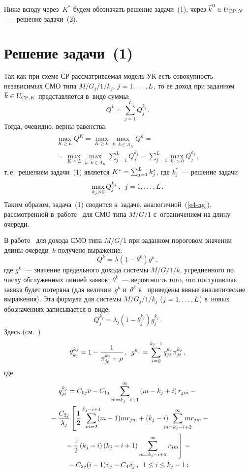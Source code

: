 \begin{multicols}{2}
  Ниже всюду через~$K^*$ будем обозначать решение задачи~(1), через 
$\overline{k}^0\hm\in U_{\mathrm{CP},N}$~--- решение задачи~(2).
     
\section{Решение задачи~(1)}

     Так как при схеме СР рассматриваемая модель УК есть совокупность 
независимых СМО типа $M/G_j/1/k_j$, $j\hm=1,\ldots ,L$, то ее доход при 
заданном $\overline{k}\hm\in U_{\mathrm{CP},K}$ представляется в~виде суммы:
     $$
     Q^{\overline{k}}=\sum\limits^L_{j=1} Q_j^{k_j}\,.
     $$
Тогда, очевидно, верны равенства:
\begin{multline}
\max\limits_{K\geq L} Q^K =\max\limits_{K\geq L} \max\limits_{\overline{k}:\ 
\overline{k}\in A_K} \!\! Q^{\overline{k}} ={}\\
{}=\max\limits_{K\geq L} 
\max\limits_{\overline{k}:\ \overline{k}\in A_K} \sum\limits^L_{j=1} Q_j^{k_j} 
=\sum\limits^L_{j=1} \max\limits_{k_j>0} Q_j^{k_j}\,,
\label{e3-ag}
\end{multline}
т.\,е.\ решением задачи~(1) является $K^*\hm= \sum\nolimits^L_{j=1} k_j^*$, 
где $k_j^*$~--- решение задачи
\begin{equation}
\max\limits_{k_j>0} Q_j^{k_j}\,,\enskip j=1,\ldots, L\,.
\label{e4-ag}
\end{equation}
Таким образом, задача~(1) сводится к~задаче, аналогичной~(\ref{e4-ag}), 
рассмотренной в~работе~\cite{12-ag} для СМО типа $M/G/1$ с~ограничением на 
длину очереди.

  В работе~\cite{12-ag} для дохода СМО типа $M/G/1$ при заданном 
пороговом значении длины очереди~$k$ получено выражение:
  $$
  Q^k=\lambda\left( 1-\theta^k\right) g^k\,,
  $$
где $g^k$~--- значение предельного дохода системы $M/G/1/k$, усредненного 
по числу обслуженных линией заявок; $\theta^k$~--- вероятность того, что 
поступившая заявка будет потеряна (для величин~$g^k$ и~$\theta^k$ 
в~\cite{12-ag} приведены явные аналитические выражения). Эта формула для 
системы $M/G_j/1/k_j$ ($j\hm=1,\ldots, L$) в~новых обозначениях записывается 
в~виде:
$$
Q_j^{k_j}=\lambda_j\left( 1-\theta_j^{k_j}\right) g_j^{k_j}\,.
$$
Здесь (см.~\cite{12-ag}) 
$$
\theta_{k_j}^{k_j} =1-\displaystyle\frac{\displaystyle 1\mathstrut}{\displaystyle \pi_{j_0}^{k_j}+\rho\mathstrut}\,,\enskip 
g^{k_j}=\sum\limits_{i=0}^{k_j-1} q^{k_j}_{ji} \pi^{k_j}_{ji}\,,
$$
где
\begin{multline*}
q_{ji}^{k_j}=C_{0j} \overline{v}-C_{1j}\sum\limits^\infty_{m=k_j-i+1}\left( m-
k_j+i\right) r_{jm}-{}\\
{}-\fr{C_{2j}}{\lambda_j}\left[ \fr{1}{2}\sum\limits_{m=2}^{k_j-i+1}\! \!\!(m-1) 
mr_{jm} +\left( k_j-i\right)\!\!\!\!\!\sum\limits^\infty_{m=k_j-i+2}\!\!\!\!\!\!\! mr_{jm}-{}\right.\hspace*{-6.5886pt}\\
\left.{}-\fr{1}{2}\left( k_j-i\right) \left( k_j-i+1\right) \sum\limits^\infty_{m=k_j-
i+2} r_{jm}\right] -{}\\
{}- C_{2j} (i-1)\overline{v}_j -C_4\overline{v}_j\,,\enskip 1\leq 
i\leq k_j-1\,;
\end{multline*}


\end{multicols}
